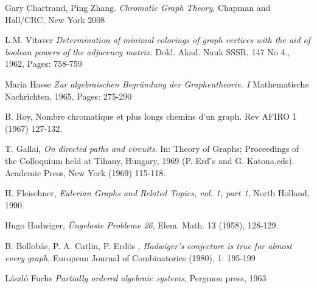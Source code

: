 {\begin{thebibliography}{9}
 Gary Chartrand, Ping Zhang. \textit{Chromatic Graph Theory}, Chapman and Hall/CRC, New York 2008

 L.M. Vitaver \textit{Determination of minimal colorings of graph vertices with the aid of boolean powers of the adjacency matrix.} Dokl. Akad. Nauk SSSR, 147 No 4., 1962, Pages: 758-759

 Maria Hasse \textit{Zur algebraischen Begr\"undung der Graphentheorie. I} Mathematische Nachrichten, 1965, Pages: 275-290

B. Roy, Nombre chromatique et plus longs chemins d'un graph. Rev AFIRO
1 (1967) 127-132.

\newpage

T. Gallai, \textit{On directed paths and circuits}. In: Theory of Graphs; Proceedings of the Colloquium held at Tihany, Hungary, 1969 (P. Erd ̋s and G. Katona,eds). Academic Press, New York (1969) 115-118.

 H. Fleischner, \textit{Eulerian Graphs and Related Topics, vol. 1, part 1}, North Holland, 1990.

 Hugo Hadwiger, \textit{\"Ungeloste Probleme 26}, Elem. Math. 13 (1958), 128-129.

 B. Bollobás, P. A. Catlin, P.  Erd\"os , \textit{Hadwiger's conjecture is true for almost every graph}, European Journal of Combinatorics (1980), 1: 195-199

  L\'aszl\'o Fuchs \textit{Partially ordered algebraic systems}, Pergmon press, 1963

\end{thebibliography}
}